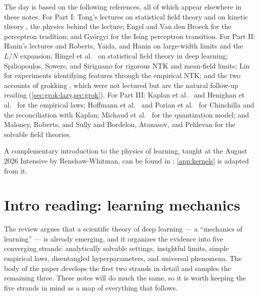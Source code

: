 \documentclass[11pt]{article}
\begin{document}
The day is based on the following references, all of which appear elsewhere in these notes. For Part I: Tong's lectures on statistical field theory and on kinetic theory \cite{TongSFT,TongKineticTheory}, the physics behind the lecture; Engel and Van den Broeck \cite{engel2001statistical} for the perceptron tradition; and Gy\"orgyi \cite{gyorgyi1990first} for the Ising perceptron transition. For Part II: Hanin's lectures \cite{hanin2026mdl} and Roberts, Yaida, and Hanin \cite{roberts2022principles} on large-width limits and the $L/N$ expansion; Ringel et al.\ \cite{ringel2025applications} on statistical field theory in deep learning; Spiliopoulos, Sowers, and Sirignano \cite{spiliopoulos2025foundations} for rigorous NTK and mean-field limits; Lin \cite{lin2025feature} for experiments identifying features through the empirical NTK; and the two accounts of grokking \cite{kumar2024grokking,rubin2024grokking}, which were not lectured but are the natural follow-up reading (\cref{sec:grok-lazy,sec:grok}). For Part III: Kaplan et al.\ \cite{kaplan2020scaling} and Henighan et al.\ \cite{henighan2020scaling} for the empirical laws; Hoffmann et al.\ \cite{hoffmann2022training} and Porian et al.\ \cite{porian2024resolving} for Chinchilla and the reconciliation with Kaplan; Michaud et al.\ \cite{michaud2023quantization} for the quantization model; and Maloney, Roberts, and Sully \cite{maloney2022solvable} and Bordelon, Atanasov, and Pehlevan \cite{bordelon2024dynamical} for the solvable field theories.

A complementary introduction to the physics of learning, taught at the August 2026 Intensive by Renshaw-Whitman, can be found in \cite{renshaw2026iliad}; \cref{app:kernels} is adapted from it.



\section{Intro reading: learning mechanics}
\label{sec:reading}

The review \cite{simon2026scientific} argues that a scientific theory of deep learning --- a ``mechanics of learning'' --- is already emerging, and it organizes the evidence into five converging strands: analytically solvable settings, insightful limits, simple empirical laws, disentangled hyperparameters, and universal phenomena. The body of the paper develops the first two strands in detail and samples the remaining three. These notes will do much the same, so it is worth keeping the five strands in mind as a map of everything that follows.
\end{document}

